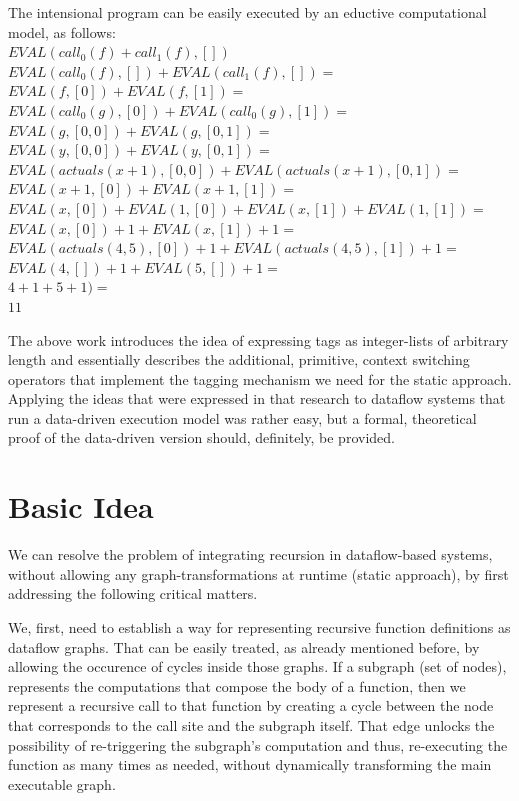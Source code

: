\documentclass[ack,preface]{dithesis}
\begin{document}
\begin{flushleft}
The intensional program can be easily executed by an eductive computational model, as follows:\\
 \setlength{\parindent}{15ex} $EVAL(call_0(f)+call_1(f), [])$ \\
$EVAL(call_0(f), []) + EVAL(call_1(f), []) =$ \\ 
$EVAL(f, [0]) + EVAL(f, [1]) =$ \\ 
$EVAL(call_0(g), [0]) + EVAL(call_0(g), [1]) =$ \\ 
$EVAL(g, [0,0]) + EVAL(g, [0,1]) =$ \\ 
$EVAL(y, [0,0]) + EVAL(y, [0,1]) =$ \\ 
$EVAL(actuals(x+1), [0,0]) + EVAL(actuals(x+1), [0,1]) =$ \\ 
$EVAL(x+1, [0]) + EVAL(x+1, [1]) =$ \\ 
$EVAL(x, [0]) + EVAL(1, [0]) + EVAL(x, [1]) + EVAL(1, [1]) =$ \\ 
$EVAL(x, [0]) + 1 + EVAL(x, [1]) + 1 =$ \\
$EVAL(actuals(4,5), [0]) + 1 + EVAL(actuals(4,5), [1]) + 1 =$ \\
$EVAL(4, []) + 1 + EVAL(5, []) + 1 =$ \\
$4+1+5+ 1) =$ \\
$11$ \\
\end{flushleft}


The above work introduces the idea of expressing tags as integer-lists of arbitrary length and essentially describes the additional, primitive, context switching operators that implement the tagging mechanism we need for the static approach. Applying the ideas that were expressed in that research to dataflow systems that run a data-driven execution model was rather easy, but a formal, theoretical proof of the data-driven version should, definitely, be provided.

    \section{Basic Idea}
We can resolve the problem of integrating recursion in dataflow-based systems, without allowing any graph-transformations at runtime (static approach), by first addressing the following critical matters.

We, first, need to establish a way for representing recursive function definitions as dataflow graphs.  That can be easily treated, as already mentioned before, by allowing the occurence of cycles inside those graphs. If a subgraph (set of nodes), represents the computations that compose the body of a function, then we represent a recursive call to that function by creating a cycle between the node that corresponds to the call site and the subgraph itself. That edge unlocks the possibility of  re-triggering the subgraph's computation and thus, re-executing the function as many times as needed, without dynamically transforming the main executable graph.
\end{document}
